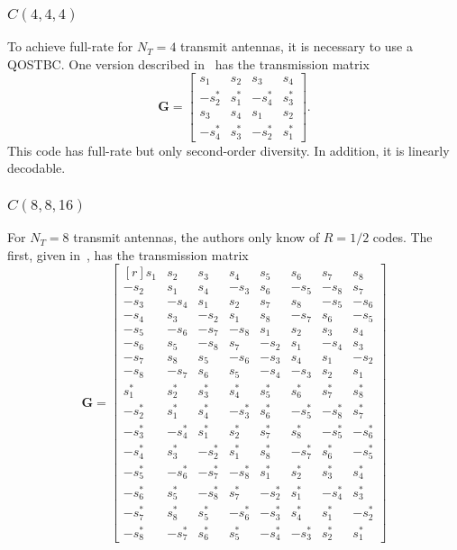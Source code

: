 \subsubsection{$C(4,4,4)$}
To achieve full-rate for $N_T=4$ transmit antennas, it is necessary to use a QOSTBC. One version described in~\cite{jafarkhani05} has the transmission matrix
\[ \bm{G} = \begin{bmatrix}
  s_1 & s_2 & s_3 & s_4 \\
  -s_2^\ast & s_1^\ast & -s_4^\ast & s_3^\ast \\
  s_3 & s_4 & s_1 & s_2 \\
  -s_4^\ast & s_3^\ast & -s_2^\ast & s_1^\ast
\end{bmatrix}. \]
This code has full-rate but only second-order diversity. In addition, it is linearly decodable.

\subsubsection{$C(8,8,16)$}
For $N_T=8$ transmit antennas, the authors only know of $R=1/2$ codes. The first, given in~\cite{tarokh99}, has the transmission matrix
\[ \bm{G} = \begin{bmatrix*}[r]
  s_1 & s_2 & s_3 & s_4 & s_5 & s_6 & s_7 & s_8 \\
  -s_2 & s_1 & s_4 & -s_3 & s_6 & -s_5 & -s_8 & s_7 \\
  -s_3 & -s_4 & s_1 & s_2 & s_7 & s_8 & -s_5 & -s_6 \\
  -s_4 & s_3 & -s_2 & s_1 & s_8 & -s_7 & s_6 & -s_5 \\
  -s_5 & -s_6 & -s_7 & -s_8 & s_1 & s_2 & s_3 & s_4 \\
  -s_6 & s_5 & -s_8 & s_7 & -s_2 & s_1 & -s_4 & s_3 \\
  -s_7 & s_8 & s_5 & -s_6 & -s_3 & s_4 & s_1 & -s_2 \\
  -s_8 & -s_7 & s_6 & s_5 & -s_4 & -s_3 & s_2 & s_1 \\
  s_1^\ast & s_2^\ast & s_3^\ast & s_4^\ast & s_5^\ast & s_6^\ast & s_7^\ast & s_8^\ast \\
  -s_2^\ast & s_1^\ast & s_4^\ast & -s_3^\ast & s_6^\ast & -s_5^\ast & -s_8^\ast & s_7^\ast \\
  -s_3^\ast & -s_4^\ast & s_1^\ast & s_2^\ast & s_7^\ast & s_8^\ast & -s_5^\ast & -s_6^\ast \\
  -s_4^\ast & s_3^\ast & -s_2^\ast & s_1^\ast & s_8^\ast & -s_7^\ast & s_6^\ast & -s_5^\ast \\
  -s_5^\ast & -s_6^\ast & -s_7^\ast & -s_8^\ast & s_1^\ast & s_2^\ast & s_3^\ast & s_4^\ast \\
  -s_6^\ast & s_5^\ast & -s_8^\ast & s_7^\ast & -s_2^\ast & s_1^\ast & -s_4^\ast & s_3^\ast \\
  -s_7^\ast & s_8^\ast & s_5^\ast & -s_6^\ast & -s_3^\ast & s_4^\ast & s_1^\ast & -s_2^\ast \\
  -s_8^\ast & -s_7^\ast & s_6^\ast & s_5^\ast & -s_4^\ast & -s_3^\ast & s_2^\ast & s_1^\ast
\end{bmatrix*} \]

